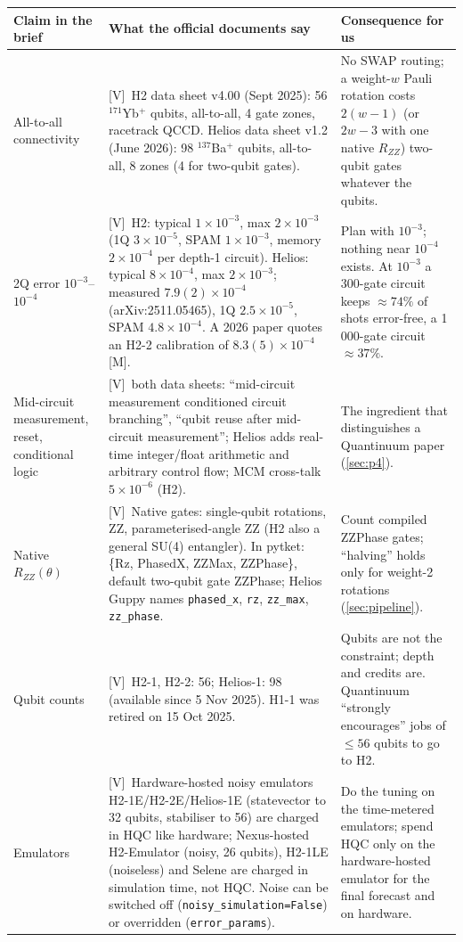 \documentclass[11pt,a4paper]{article}
\newcommand{\lV}{\textcolor{keyblue}{[V]}}   %
\newcommand{\lM}{\textcolor{alertred}{[M]}}  %
\begin{document}
\begin{center}\small
\begin{tabularx}{\linewidth}{@{}L{3.3cm}YY@{}}
\toprule
Claim in the brief & What the official documents say & Consequence for us\\\midrule
All-to-all connectivity & \lV\ H2 data sheet v4.00 (Sept 2025): 56 ${}^{171}$Yb$^+$ qubits, all-to-all, 4 gate zones, racetrack QCCD. Helios data sheet v1.2 (June 2026): 98 ${}^{137}$Ba$^+$ qubits, all-to-all, 8 zones (4 for two-qubit gates). & No SWAP routing; a weight-$w$ Pauli rotation costs $2(w-1)$ (or $2w-3$ with one native $R_{ZZ}$) two-qubit gates whatever the qubits.\\
2Q error $10^{-3}$--$10^{-4}$ & \lV\ H2: typical $1\times10^{-3}$, max $2\times10^{-3}$ (1Q $3\times10^{-5}$, SPAM $1\times10^{-3}$, memory $2\times10^{-4}$ per depth-1 circuit). Helios: typical $8\times10^{-4}$, max $2\times10^{-3}$; measured $7.9(2)\times10^{-4}$ (arXiv:2511.05465), 1Q $2.5\times10^{-5}$, SPAM $4.8\times10^{-4}$. A 2026 paper quotes an H2-2 calibration of $8.3(5)\times10^{-4}$ \lM. & Plan with $10^{-3}$; nothing near $10^{-4}$ exists. At $10^{-3}$ a 300-gate circuit keeps $\approx74\%$ of shots error-free, a 1\,000-gate circuit $\approx37\%$.\\
Mid-circuit measurement, reset, conditional logic & \lV\ both data sheets: ``mid-circuit measurement conditioned circuit branching'', ``qubit reuse after mid-circuit measurement''; Helios adds real-time integer/float arithmetic and arbitrary control flow; MCM cross-talk $5\times10^{-6}$ (H2). & The ingredient that distinguishes a Quantinuum paper (\cref{sec:p4}).\\
Native $R_{ZZ}(\theta)$ & \lV\ Native gates: single-qubit rotations, ZZ, parameterised-angle ZZ (H2 also a general SU(4) entangler). In pytket: \{Rz, PhasedX, ZZMax, ZZPhase\}, default two-qubit gate ZZPhase; Helios Guppy names \texttt{phased\_x}, \texttt{rz}, \texttt{zz\_max}, \texttt{zz\_phase}. & Count compiled ZZPhase gates; ``halving'' holds only for weight-2 rotations (\cref{sec:pipeline}).\\
Qubit counts & \lV\ H2-1, H2-2: 56; Helios-1: 98 (available since 5 Nov 2025). H1-1 was retired on 15 Oct 2025. & Qubits are not the constraint; depth and credits are. Quantinuum ``strongly encourages'' jobs of $\le56$ qubits to go to H2.\\
Emulators & \lV\ Hardware-hosted noisy emulators H2-1E/H2-2E/Helios-1E (statevector to 32 qubits, stabiliser to 56) are charged in HQC like hardware; Nexus-hosted H2-Emulator (noisy, 26 qubits), H2-1LE (noiseless) and Selene are charged in simulation time, not HQC. Noise can be switched off (\texttt{noisy\_simulation=False}) or overridden (\texttt{error\_params}). & Do the tuning on the time-metered emulators; spend HQC only on the hardware-hosted emulator for the final forecast and on hardware.\\
\bottomrule
\end{tabularx}
\end{center}
\end{document}
